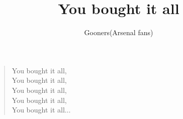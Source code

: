 \documentclass[a4paper,12pt]{article}
\title{You bought it all}
\author{Gooners(Arsenal fans)}
\date{}
\begin{document}
	
	\maketitle
	
	\begin{verse}
		
		You bought it all, \\
		You bought it all, \\
		You bought it all, \\
		You bought it all, \\
		You bought it all$\ldots$
		
	\end{verse}
	
\end{document}
